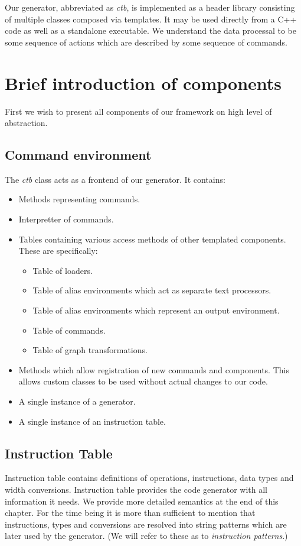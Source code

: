 Our generator, abbreviated as \emph{ctb}, is implemented as a header library consisting of multiple classes composed via templates. It may be used directly from a C++ code as well as a standalone executable. We understand the data processal to be some sequence of actions which are described by some sequence of commands. 

\section{Brief introduction of components}
First we wish to present all components of our framework on high level of abstraction.

\subsection{Command environment}
  The \emph{ctb} class acts as a frontend of our generator. It contains:
  \begin{itemize}
    \item Methods representing commands.
    \item Interpretter of commands.
    \item Tables containing various access methods of other templated components. These are specifically:
    \begin{itemize}
      \item Table of loaders.
      \item Table of alias environments which act as separate text processors.
      \item Table of alias environments which represent an output environment.
      \item Table of commands.
      \item Table of graph transformations.
    \end{itemize}
    \item Methods which allow registration of new commands and components. This allows custom classes to be used without actual changes to our code.
    \item A single instance of a generator.
    \item A single instance of an instruction table.
  \end{itemize}

\subsection{Instruction Table} 
  Instruction table contains definitions of operations, instructions, data types and width conversions. Instruction table provides the code generator with all information it needs. We provide more detailed semantics at the end of this chapter. For the time being it is more than sufficient to mention that instructions, types and conversions are resolved into string patterns which are later used by the generator. (We will refer to these as to \emph{instruction patterns}.)

